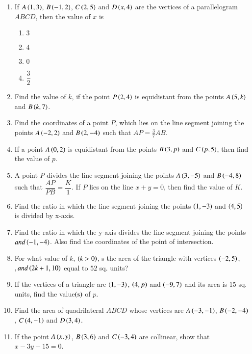 \documentclass[journal,12pt,onecolumn]{IEEEtran}
\theoremstyle{remark}
\begin{document}
\begin{enumerate}
\item If $A\left(1,3\right)$, $B\left(-1,2\right)$, $C\left(2,5\right)$ and $D\left(x,4\right)$ are the vertices of a parallelogram $ABCD$, then the value of $x$ is
\begin{enumerate}
\item $3$\\
\item $4$\\
\item $0$\\
\item $\dfrac{3}{2}$\\
\end{enumerate}
\item Find the value of $k$, if the point $P\left(2,4\right)$ is equidistant from the points $A\left(5,k\right)$ and $B\left(k,7\right)$.\\
\item Find the coordinates of a point $P$, which lies on the line segment joining the points $A\left(-2,2\right)$ and $B\left(2,-4\right)$ such that $AP = \frac{3}{7} AB$.\\

\item If a point $A\left(0,2\right)$ is equidistant from the points $B\left(3,p\right)$ and $C\left(p,5\right)$, then find the value of $p$.\\
\item A point $P$ divides the line segment joining the points $A\left(3,-5\right)$ and $B\left(-4,8\right)$ such that $\dfrac{AP}{PB} = \dfrac{K}{1}$. If $P$ lies on the line $x + y = 0$, then find the value of $K$.\\
\item Find the ratio in which the line segment joining the points $\left(1,-3\right)$ and $\left(4,5\right)$ is divided by x-axis.\\
\item Find the ratio in which the y-axis divides the line segment joining the points $ and \left(-1,-4\right)$. Also find the coordinates of the point of intersection.\\

\item For what value of $k$, $\left( k > 0\right)$, s the area of the triangle with vertices $\left(-2,5\right)$, $, and \left(2k+1,10\right)$ equal to $52$ sq. units?\\

\item If the vertices of a triangle are $\left(1,-3\right)$, $\left(4,p\right)$ and $\left(-9,7\right)$ and its area is $15$ sq. units, find the value$\left(\text{s}\right)$ of $p$.\\
\item Find the area of quadrilateral $ABCD$ whose vertices are $A\left(-3,-1\right)$, $B\left(-2,-4\right)$, $C\left(4,-1\right)$ and $D\left(3,4\right)$.\\

\item If the point $A\left(x,y\right)$, $B\left(3,6\right)$ and $C\left(-3,4\right)$ are collinear, show that $x - 3y + 15 = 0$.\\
\end{enumerate}
\end{document}
